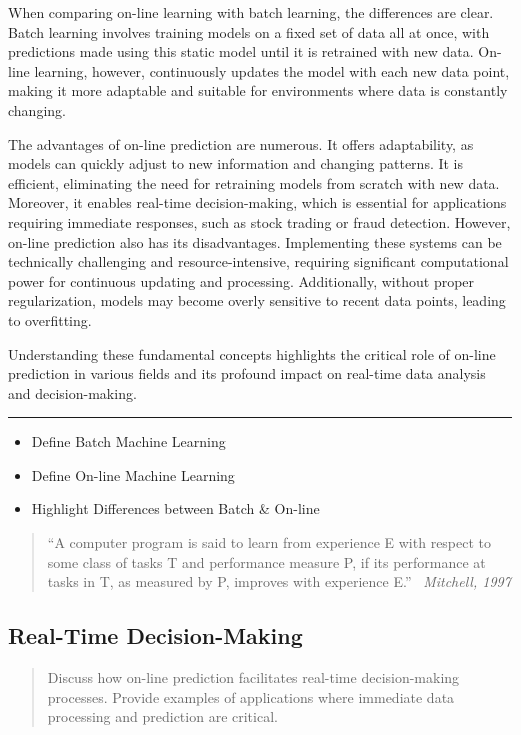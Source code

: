 \documentclass[11pt]{article} %
\theoremstyle{plain}
\theoremstyle{definition}
\begin{document}
When comparing on-line learning with batch learning, the differences are clear. Batch learning involves training models on a fixed set of data all at once, with predictions made using this static model until it is retrained with new data. On-line learning, however, continuously updates the model with each new data point, making it more adaptable and suitable for environments where data is constantly changing.

The advantages of on-line prediction are numerous. It offers adaptability, as models can quickly adjust to new information and changing patterns. It is efficient, eliminating the need for retraining models from scratch with new data. Moreover, it enables real-time decision-making, which is essential for applications requiring immediate responses, such as stock trading or fraud detection. However, on-line prediction also has its disadvantages. Implementing these systems can be technically challenging and resource-intensive, requiring significant computational power for continuous updating and processing. Additionally, without proper regularization, models may become overly sensitive to recent data points, leading to overfitting.

Understanding these fundamental concepts highlights the critical role of on-line prediction in various fields and its profound impact on real-time data analysis and decision-making.

\noindent\rule{\textwidth}{0.1pt}

\begin{itemize}
  \item Define Batch Machine Learning
  \item Define On-line Machine Learning
  \item Highlight Differences between Batch \& On-line
\end{itemize}

\begin{quote}
  ``A computer program is said to learn from experience E with respect to some class
  of tasks T and performance measure P, if its performance at tasks in T, as 
  measured by P, improves with experience E.'' \textendash\ \textit{Mitchell, 1997}
\end{quote}

\subsection{Real-Time Decision-Making}
\begin{quote}
  Discuss how on-line prediction facilitates real-time decision-making processes. Provide examples of applications where immediate data processing and prediction are critical.
\end{quote}
\end{document}
